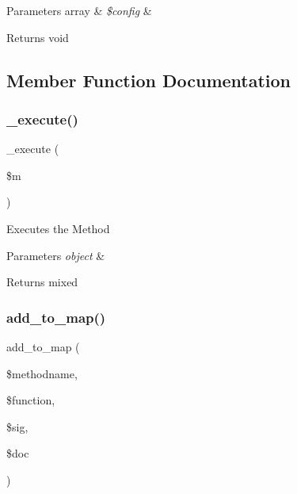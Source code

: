 \begin{DoxyParams}[1]{Parameters}
array & {\em \$config} & \\
\hline
\end{DoxyParams}
\begin{DoxyReturn}{Returns}
void 
\end{DoxyReturn}


\subsection{Member Function Documentation}
\mbox{\label{class_c_i___xmlrpcs_a2f039adb8ec59c693300993c95138b46}} 
\subsubsection{\texorpdfstring{\+\_\+execute()}{\_execute()}}
{\footnotesize\ttfamily \+\_\+execute (\begin{DoxyParamCaption}\item[{}]{\$m }\end{DoxyParamCaption})\hspace{0.3cm}{\ttfamily [protected]}}

Executes the Method


\begin{DoxyParams}{Parameters}
{\em object} & \\
\hline
\end{DoxyParams}
\begin{DoxyReturn}{Returns}
mixed 
\end{DoxyReturn}
\mbox{\label{class_c_i___xmlrpcs_a73b29191620c55a5e2d3fda3a5c3cf44}} 
\subsubsection{\texorpdfstring{add\+\_\+to\+\_\+map()}{add\_to\_map()}}
{\footnotesize\ttfamily add\+\_\+to\+\_\+map (\begin{DoxyParamCaption}\item[{}]{\$methodname,  }\item[{}]{\$function,  }\item[{}]{\$sig,  }\item[{}]{\$doc }\end{DoxyParamCaption})}

